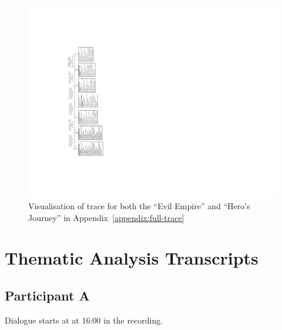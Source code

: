 \documentclass[11pt]{report}
\begin{document}
\begin{figure}[!p]
\centerline{\includegraphics[height=0.9\textheight]{hjee70-rot.pdf}}
\caption{Visualisation of trace for both the ``Evil Empire'' and ``Hero's Journey'' in Appendix~\ref{appendix:full-trace}}\label{fig:hjee-trace}
\end{figure}

\chapter{Thematic Analysis Transcripts}
\label{appendix:transcripts}

\def\feature#1{\todo[color=green,size=\scriptsize]{\textbf{Feature:} #1}}

\def\usability#1{\todo[color=cyan,size=\scriptsize]{\textbf{Usability:} #1}}

\def\bug#1{\todo[color=red,size=\scriptsize]{\textbf{Limitation:} #1}}

\def\syntax#1{\todo[color=yellow,size=\scriptsize]{\textbf{Syntax:} #1}}

\section{Participant A}
Dialogue starts at at 16:00 in the recording.

\end{document}
